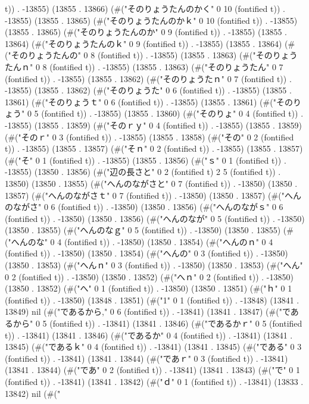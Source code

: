t)) . -13855) (13855 . 13866) (#("そのりょうたんのかく" 0 10 (fontified t)) . -13855) (13855 . 13865) (#("そのりょうたんのかｋ" 0 10 (fontified t)) . -13855) (13855 . 13865) (#("そのりょうたんのか" 0 9 (fontified t)) . -13855) (13855 . 13864) (#("そのりょうたんのｋ" 0 9 (fontified t)) . -13855) (13855 . 13864) (#("そのりょうたんの" 0 8 (fontified t)) . -13855) (13855 . 13863) (#("そのりょうたんｎ" 0 8 (fontified t)) . -13855) (13855 . 13863) (#("そのりょうたん" 0 7 (fontified t)) . -13855) (13855 . 13862) (#("そのりょうたｎ" 0 7 (fontified t)) . -13855) (13855 . 13862) (#("そのりょうた" 0 6 (fontified t)) . -13855) (13855 . 13861) (#("そのりょうｔ" 0 6 (fontified t)) . -13855) (13855 . 13861) (#("そのりょう" 0 5 (fontified t)) . -13855) (13855 . 13860) (#("そのりょ" 0 4 (fontified t)) . -13855) (13855 . 13859) (#("そのｒｙ" 0 4 (fontified t)) . -13855) (13855 . 13859) (#("そのｒ" 0 3 (fontified t)) . -13855) (13855 . 13858) (#("その" 0 2 (fontified t)) . -13855) (13855 . 13857) (#("そｎ" 0 2 (fontified t)) . -13855) (13855 . 13857) (#("そ" 0 1 (fontified t)) . -13855) (13855 . 13856) (#("ｓ" 0 1 (fontified t)) . -13855) (13850 . 13856) (#("辺の長さと" 0 2 (fontified t) 2 5 (fontified t)) . 13850) (13850 . 13855) (#("へんのながさと" 0 7 (fontified t)) . -13850) (13850 . 13857) (#("へんのながさｔ" 0 7 (fontified t)) . -13850) (13850 . 13857) (#("へんのながさ" 0 6 (fontified t)) . -13850) (13850 . 13856) (#("へんのながｓ" 0 6 (fontified t)) . -13850) (13850 . 13856) (#("へんのなが" 0 5 (fontified t)) . -13850) (13850 . 13855) (#("へんのなｇ" 0 5 (fontified t)) . -13850) (13850 . 13855) (#("へんのな" 0 4 (fontified t)) . -13850) (13850 . 13854) (#("へんのｎ" 0 4 (fontified t)) . -13850) (13850 . 13854) (#("へんの" 0 3 (fontified t)) . -13850) (13850 . 13853) (#("へんｎ" 0 3 (fontified t)) . -13850) (13850 . 13853) (#("へん" 0 2 (fontified t)) . -13850) (13850 . 13852) (#("へｎ" 0 2 (fontified t)) . -13850) (13850 . 13852) (#("へ" 0 1 (fontified t)) . -13850) (13850 . 13851) (#("ｈ" 0 1 (fontified t)) . -13850) (13848 . 13851) (#("1" 0 1 (fontified t)) . -13848) (13841 . 13849) nil (#("であるから," 0 6 (fontified t)) . -13841) (13841 . 13847) (#("であるから" 0 5 (fontified t)) . -13841) (13841 . 13846) (#("であるかｒ" 0 5 (fontified t)) . -13841) (13841 . 13846) (#("であるか" 0 4 (fontified t)) . -13841) (13841 . 13845) (#("であるｋ" 0 4 (fontified t)) . -13841) (13841 . 13845) (#("である" 0 3 (fontified t)) . -13841) (13841 . 13844) (#("であｒ" 0 3 (fontified t)) . -13841) (13841 . 13844) (#("であ" 0 2 (fontified t)) . -13841) (13841 . 13843) (#("で" 0 1 (fontified t)) . -13841) (13841 . 13842) (#("ｄ" 0 1 (fontified t)) . -13841) (13833 . 13842) nil (#("
